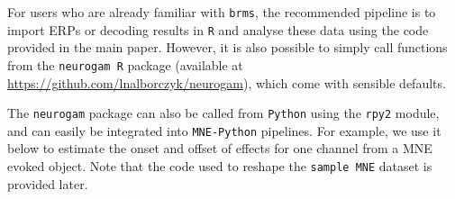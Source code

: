 \documentclass[
  doc,
  floatsintext,
  longtable,
  a4paper,
  nolmodern,
  notxfonts,
  notimes,
  colorlinks=true,linkcolor=blue,citecolor=blue,urlcolor=blue]{apa7}
\newenvironment{Shaded}{\begin{snugshade}}{\end{snugshade}}
\newcommand{\AttributeTok}[1]{\textcolor[rgb]{0.40,0.45,0.13}{#1}}
\newcommand{\CommentTok}[1]{\textcolor[rgb]{0.37,0.37,0.37}{#1}}
\newcommand{\DecValTok}[1]{\textcolor[rgb]{0.68,0.00,0.00}{#1}}
\newcommand{\FunctionTok}[1]{\textcolor[rgb]{0.28,0.35,0.67}{#1}}
\newcommand{\NormalTok}[1]{\textcolor[rgb]{0.00,0.23,0.31}{#1}}
\newcommand{\OtherTok}[1]{\textcolor[rgb]{0.00,0.23,0.31}{#1}}
\newcommand{\SpecialCharTok}[1]{\textcolor[rgb]{0.37,0.37,0.37}{#1}}
\newcommand{\StringTok}[1]{\textcolor[rgb]{0.13,0.47,0.30}{#1}}
\begin{document}
For users who are already familiar with \texttt{brms}, the recommended
pipeline is to import ERPs or decoding results in \texttt{R} and analyse
these data using the code provided in the main paper. However, it is
also possible to simply call functions from the \texttt{neurogam\ R}
package (available at \url{https://github.com/lnalborczyk/neurogam}),
which come with sensible defaults.

\begin{Shaded}
\end{Shaded}

The \texttt{neurogam} package can also be called from \texttt{Python}
using the \texttt{rpy2} module, and can easily be integrated into
\texttt{MNE-Python} pipelines. For example, we use it below to estimate
the onset and offset of effects for one channel from a MNE evoked
object. Note that the code used to reshape the \texttt{sample\ MNE}
dataset is provided later.
\end{document}
